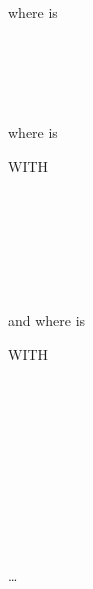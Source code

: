 where  is

\begin{syntax}
  \begin{1=}
    \identifier \\
    \literal \\
    \functionname
  \end{1=}
   \\
\end{syntax}

where  is

\begin{syntax}
  \begin{0-1}
    WITH 
    \begin{1=}
       \\
       \\
    \end{1=}
  \end{0-1}
  \begin{1=}
    \condition \\
  \end{1=} \\
\end{syntax}

and where  is

\begin{syntax}
  \begin{0-1}
    WITH 
    \begin{1=}
       \\
       \\
    \end{1=}
  \end{0-1}

   \identifier {}
  \begin{1=}
    \identifier \\
    \literal
  \end{1=}
  \begin{1=}
    \identifier \\
    \literal
  \end{1=}
  \condition

  \begin{0-1}
     \identifier {}
    \begin{1=}
      \identifier \\
      \literal
    \end{1=}
    \begin{1=}
      \identifier \\
      \literal
    \end{1=}

    \condition
  \end{0-1} \ldots
\end{syntax}

